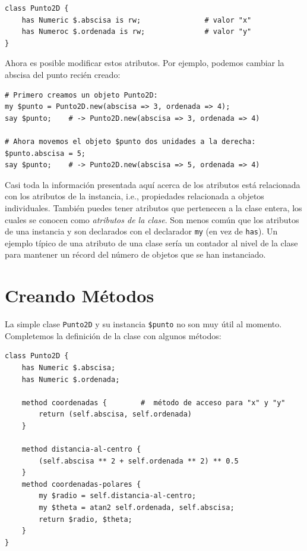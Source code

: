 \begin{lstlisting}
class Punto2D {
	has Numeric $.abscisa is rw;               # valor "x"
	has Numeroc $.ordenada is rw;              # valor "y" 
}
\end{lstlisting}
%
Ahora es posible modificar estos atributos. Por ejemplo,
podemos cambiar la abscisa del punto recién creado:

\begin{lstlisting}
# Primero creamos un objeto Punto2D:
my $punto = Punto2D.new(abscisa => 3, ordenada => 4);
say $punto;    # -> Punto2D.new(abscisa => 3, ordenada => 4)

# Ahora movemos el objeto $punto dos unidades a la derecha:
$punto.abscisa = 5; 
say $punto;    # -> Punto2D.new(abscisa => 5, ordenada => 4)
\end{lstlisting}


Casi toda la información presentada aquí acerca de los atributos
está relacionada con los atributos de la instancia, i.e., propiedades
relacionada a objetos individuales. También puedes tener atributos que
pertenecen a la clase entera, los cuales se conocen como \emph{atributos de la
clase}. Son menos común que los atributos de una instancia y son declarados
con el declarador {\tt my} (en vez de {\tt has}). Un ejemplo típico de
una atributo de una clase sería un contador al nivel de la clase para
mantener un récord del número de objetos que se han instanciado.


\section{Creando Métodos}

La simple clase {\tt Punto2D} y su instancia \verb|$punto|
no son muy útil al momento. Completemos la definición de la
clase con algunos métodos:

\begin{lstlisting}
class Punto2D {
    has Numeric $.abscisa;
    has Numeric $.ordenada;
    
    method coordenadas {        #  método de acceso para "x" y "y"
        return (self.abscisa, self.ordenada)
    }
    
    method distancia-al-centro {
        (self.abscisa ** 2 + self.ordenada ** 2) ** 0.5
    }
    method coordenadas-polares {
        my $radio = self.distancia-al-centro;
        my $theta = atan2 self.ordenada, self.abscisa;
        return $radio, $theta;
    }
}
\end{lstlisting}

